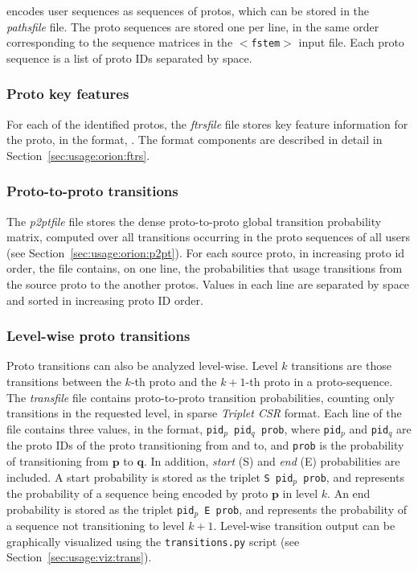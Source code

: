 \documentclass[]{article}
\def\vec#1{{\mathbf{\boldsymbol #1}}}
\def\inputf{{\tt$<$fstem$>$}\xspace}
\begin{document}
\orion encodes user sequences as sequences of protos, which can be stored in
the \emph{pathsfile} file. The proto sequences are stored one per line, in the
same order corresponding to the sequence matrices in the \inputf input file.
Each proto sequence is a list of proto IDs separated by space.

\subsubsection{Proto key features}
\label{sec:usage:oformat:ftrs}

For each of the identified protos, the \emph{ftrsfile} file stores key feature
information for the proto, in the format,\newline
{}.\newline
The format components are described in detail in Section~\ref{sec:usage:orion:ftrs}.

\subsubsection{Proto-to-proto transitions}
\label{sec:usage:oformat:p2pt}

The \emph{p2ptfile} file stores the dense proto-to-proto global transition
probability matrix, computed over all transitions occurring in the proto
sequences of all users (see Section~\ref{sec:usage:orion:p2pt}). For each source
proto, in increasing proto id order, the file contains, on one line, the
probabilities that usage transitions from the source proto to the another
protos. Values in each line are separated by space and sorted in increasing
proto ID order.

\subsubsection{Level-wise proto transitions}
\label{sec:usage:oformat:trans}

Proto transitions can also be analyzed level-wise. Level $k$ transitions are
those transitions between the $k$-th proto and the $k+1$-th proto in a
proto-sequence. The \emph{transfile} file contains proto-to-proto transition
probabilities, counting only transitions in the requested level, in sparse
\emph{Triplet CSR} format. Each line of the file contains three values, in the
format, {\tt pid$_p$ pid$_q$ prob}, where {\tt pid$_p$} and {\tt pid$_q$} are
the proto IDs of the proto transitioning from and to, and {\tt prob} is the
probability of transitioning from $\vec p$ to $\vec q$. In addition,
\emph{start} (S) and \emph{end} (E) probabilities are included. A start
probability is stored as the triplet {\tt S pid$_p$ prob}, and represents the
probability of a sequence being encoded by proto $\vec p$ in level $k$. An end
probability is stored as the triplet {\tt pid$_p$ E prob}, and represents the
probability of a sequence not transitioning to level $k+1$. Level-wise
transition output can be graphically visualized using the {\tt transitions.py}
script (see Section~\ref{sec:usage:viz:trans}).
\end{document}
